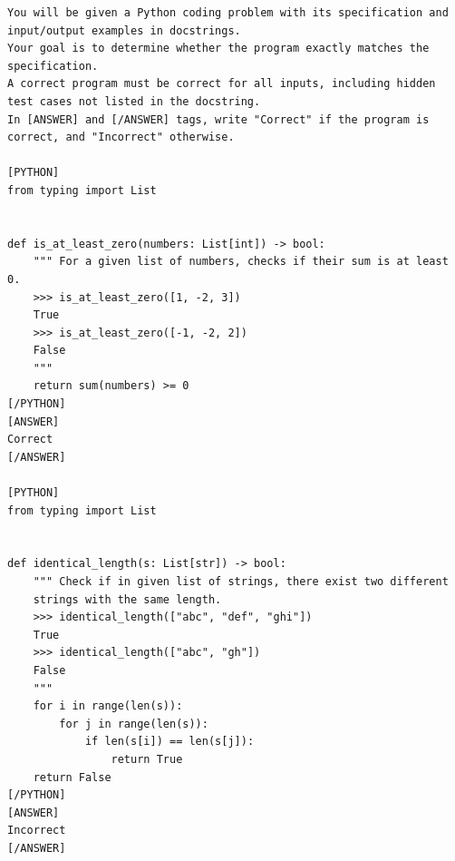 \begin{lstlisting}[caption={Prompt for correctness checking (HumanEval)},label={lst:correctness-checking-prompt-no-cot}, style=boxed]
You will be given a Python coding problem with its specification and input/output examples in docstrings. 
Your goal is to determine whether the program exactly matches the specification. 
A correct program must be correct for all inputs, including hidden test cases not listed in the docstring.
In [ANSWER] and [/ANSWER] tags, write "Correct" if the program is correct, and "Incorrect" otherwise.

[PYTHON]
from typing import List


def is_at_least_zero(numbers: List[int]) -> bool:
    """ For a given list of numbers, checks if their sum is at least 0.
    >>> is_at_least_zero([1, -2, 3])
    True
    >>> is_at_least_zero([-1, -2, 2])
    False
    """
    return sum(numbers) >= 0
[/PYTHON]
[ANSWER]
Correct
[/ANSWER]

[PYTHON]
from typing import List


def identical_length(s: List[str]) -> bool:
    """ Check if in given list of strings, there exist two different
    strings with the same length.
    >>> identical_length(["abc", "def", "ghi"])
    True
    >>> identical_length(["abc", "gh"])
    False
    """
    for i in range(len(s)):
        for j in range(len(s)):
            if len(s[i]) == len(s[j]):
                return True
    return False
[/PYTHON]
[ANSWER]
Incorrect
[/ANSWER]
\end{lstlisting}

